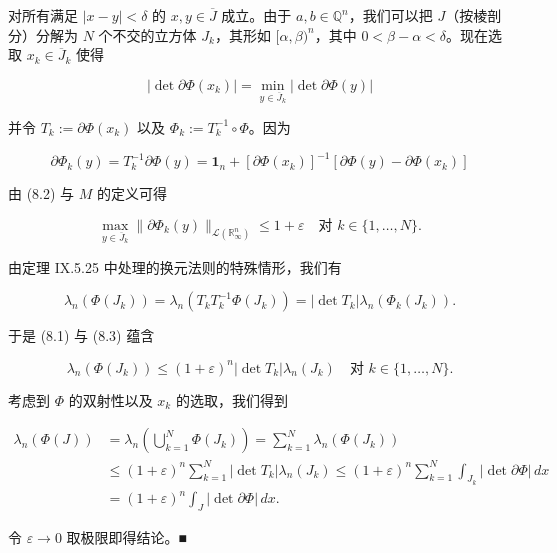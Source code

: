 \begin{lemma}
\begin{subitems}
对所有满足 $ |x - y| < \delta $ 的 $ x, y \in \overline{J} $ 成立。由于 $ a, b \in \mathbb{Q}^{n} $，我们可以把 $ J $（按棱剖分）分解为 $ N $ 个不交的立方体 $ J_{k} $，其形如 $ [\alpha, \beta)^{n} $，其中 $ 0 < \beta - \alpha < \delta $。现在选取 $ x_{k} \in \overline{J}_{k} $ 使得

\[
|\det \partial\Phi(x_{k})| = \min_{y\in \overline{J}_{k}} |\det \partial\Phi(y)|
\]

并令 $ T_{k} := \partial\Phi(x_{k}) $ 以及 $ \Phi_{k} := T_{k}^{-1} \circ \Phi $。因为

\[
\partial\Phi_{k}(y) = T_{k}^{-1}\partial\Phi(y) = \mathbf{1}_{n} + [\partial\Phi(x_{k})]^{-1}[\partial\Phi(y) - \partial\Phi(x_{k})]
\]

由 (8.2) 与 $ M $ 的定义可得

\begin{equation}
\max_{y\in \overline{J}_{k}} \|\partial\Phi_{k}(y)\|_{\mathcal{L}(\mathbb{R}^{n}_{\infty})} \le 1 + \varepsilon \quad \text{对 } k \in \{1, \dots, N\} .\tag{8.3}
\end{equation}

由定理 IX.5.25 中处理的换元法则的特殊情形，我们有

\[
\lambda_{n}(\Phi(J_{k})) = \lambda_{n}(T_{k} T_{k}^{-1}\Phi(J_{k})) = |\det T_{k}| \lambda_{n}(\Phi_{k}(J_{k})) .
\]

于是 (8.1) 与 (8.3) 蕴含

\[
\lambda_{n}(\Phi(J_{k})) \le (1 + \varepsilon)^{n} |\det T_{k}| \lambda_{n}(J_{k}) \quad \text{对 } k \in \{1, \dots, N\} .
\]

考虑到 $ \Phi $ 的双射性以及 $ x_{k} $ 的选取，我们得到

\begin{equation*}
\begin{aligned}
\lambda_{n}(\Phi(J)) &= \lambda_{n}\left(\bigcup_{k=1}^{N} \Phi(J_{k})\right) = \sum_{k=1}^{N} \lambda_{n}(\Phi(J_{k})) \\ &\le (1 + \varepsilon)^{n} \sum_{k=1}^{N} |\det T_{k}| \lambda_{n}(J_{k}) \le (1 + \varepsilon)^{n} \sum_{k=1}^{N} \int_{J_{k}} |\det \partial\Phi| \, dx \\ &= (1 + \varepsilon)^{n} \int_{J} |\det \partial\Phi| \, dx .
\end{aligned}
\end{equation*}

令 $ \varepsilon \to 0 $ 取极限即得结论。\nobreak\hspace{0.35em}■

\end{subitems}

\end{lemma}

